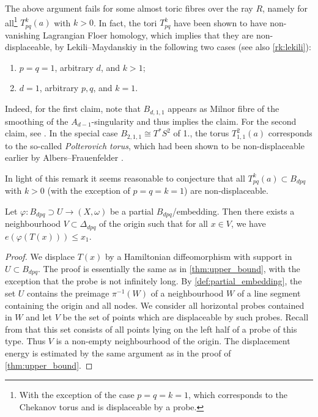 \documentclass[AIF,Unicode,manuscript]{cedram}
\begin{document}
\begin{remark}
    \label{rk:nondisplaceable}
    The above argument fails for some almost toric fibres over the ray $R$, namely for all\footnote{With the exception of the case $p=q=k=1$, which corresponds to the Chekanov torus and is displaceable by a probe.} $T^k_{pq}(a)$ with $k > 0$.
In fact, the tori $T^k_{pq}$ have been shown to have non-vanishing Lagrangian Floer homology, which implies that they are non-displaceable, by Lekili--Maydanskiy \cite{LekMay14} in the following two cases (see also \cref{rk:lekili}):
    \begin{enumerate}
        \item $p = q = 1$, arbitrary $d$, and $k > 1$;
        \item $d = 1$, arbitrary $p,q$, and $k = 1$.
    \end{enumerate}
    Indeed, for the first claim, note that $B_{d,1,1}$ appears as Milnor fibre of the smoothing of the $A_{d-1}$-singularity and thus \cite[Proposition 2.20]{LekMay14} implies the claim.
For the second claim, see \cite[Proposition 3.6]{LekMay14}.
In the special case $B_{2,1,1} \cong T^*S^2$ of 1., the torus $T_{1,1}^2(a)$ corresponds to the so-called \emph{Polterovich torus}, which had been shown to be non-displaceable earlier by Albers--Frauenfelder \cite{AlbFra08}.
\end{remark}

In light of this remark it seems reasonable to conjecture that all $T^k_{pq}(a) \subset B_{dpq}$ with $k > 0$ (with the exception of $p=q=k=1$) are non-displaceable.


\begin{proposition}
\label{thm:upper_bound_embedded}
  Let $φ\colon B_{dpq} ⊃ U → (X,ω)$ be a partial $B_{dpq}$\-/embedding.
Then there exists a neighbourhood $V \subset \Delta_{dpq}$ of the origin such that for all $x \in V$, we have $e(φ(T(x))) \leq x_1$.
\end{proposition}

\begin{proof}
    We displace $T(x)$ by a Hamiltonian diffeomorphism with support in $U \subset B_{dpq}$.
The proof is essentially the same as in \cref{thm:upper_bound}, with the exception that the probe is not infinitely long.
By \cref{def:partial_embedding}, the set $U$ contains the preimage $\pi^{-1}(W)$ of a neighbourhood $W$ of a line segment containing the origin and all nodes.
We consider all horizontal probes contained in $W$ and let $V$ be the set of points which are displaceable by such probes.
Recall from \cite[Section 2.1]{mcduff2011displacing} that this set consists of all points lying on the left half of a probe of this type.
Thus $V$ is a non-empty neighbourhood of the origin.
The displacement energy is estimated by the same argument as in the proof of \cref{thm:upper_bound}.
\end{proof}
\end{document}
